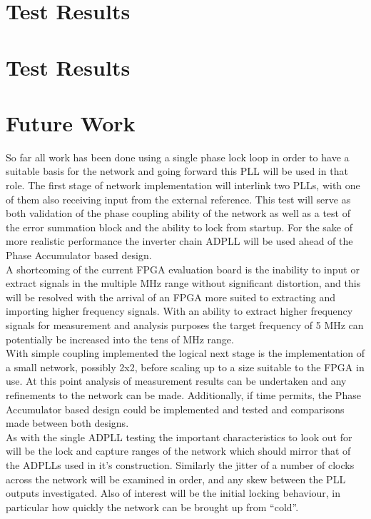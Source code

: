 \documentclass[11pt,english,british]{report}
\begin{document}
\chapter{Test Results}
\chapter{Test Results}

\chapter{Future Work}

So far all work has been done using a single phase lock loop in order to have a suitable basis for the network and going forward this PLL will be used in that role. The first stage of network implementation will interlink two PLLs, with one of them also receiving input from the external reference. This test will serve as both validation of the phase coupling ability of the network as well as a test of the error summation block and the ability to lock from startup. For the sake of more realistic performance the inverter chain ADPLL will be used ahead of the Phase Accumulator based design.\\
A shortcoming of the current FPGA evaluation board is the inability to input or extract signals in the multiple MHz range without significant distortion, and this will be resolved with the arrival of an FPGA more suited to extracting and importing higher frequency signals. With an ability to extract higher frequency signals for measurement and analysis purposes the target frequency of 5 MHz can potentially be increased into the tens of MHz range.\\
With simple coupling implemented the logical next stage is the implementation of a small network, possibly 2x2, before scaling up to a size suitable to the FPGA in use. At this point analysis of measurement results can be undertaken and any refinements to the network can be made. Additionally, if time permits, the Phase Accumulator based design could be implemented and tested and comparisons made between both designs.\\
As with the single ADPLL testing the important characteristics to look out for will be the lock and capture ranges of the network which should mirror that of the ADPLLs used in it's construction. Similarly the jitter of a number of clocks across the network will be examined in order, and any skew between the PLL outputs investigated. Also of interest will be the initial locking behaviour, in particular how quickly the network can be brought up from ``cold''.

\newpage
 

\end{document}
